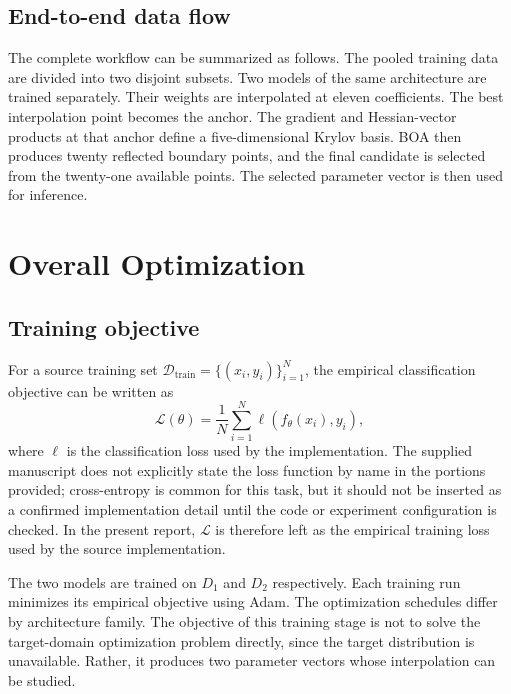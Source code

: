 \documentclass[11pt,a4paper]{article}
\newcommand{\D}{\mathcal{D}}
\begin{document}
\subsection{End-to-end data flow}
The complete workflow can be summarized as follows. The pooled training data are divided into two disjoint subsets. Two models of the same architecture are trained separately. Their weights are interpolated at eleven coefficients. The best interpolation point becomes the anchor. The gradient and Hessian-vector products at that anchor define a five-dimensional Krylov basis. BOA then produces twenty reflected boundary points, and the final candidate is selected from the twenty-one available points. The selected parameter vector is then used for inference.

\section{Overall Optimization}

\subsection{Training objective}
For a source training set $\D_{\mathrm{train}}=\{(x_i,y_i)\}_{i=1}^{N}$, the empirical classification objective can be written as
\begin{equation}
 \mathcal{L}(\theta)=\frac{1}{N}\sum_{i=1}^{N}
 \ell(f_\theta(x_i),y_i),
 \label{eq:empirical_loss}
\end{equation}
where $\ell$ is the classification loss used by the implementation. The supplied manuscript does not explicitly state the loss function by name in the portions provided; cross-entropy is common for this task, but it should not be inserted as a confirmed implementation detail until the code or experiment configuration is checked. In the present report, $\mathcal{L}$ is therefore left as the empirical training loss used by the source implementation.

The two models are trained on $D_1$ and $D_2$ respectively. Each training run minimizes its empirical objective using Adam. The optimization schedules differ by architecture family. The objective of this training stage is not to solve the target-domain optimization problem directly, since the target distribution is unavailable. Rather, it produces two parameter vectors whose interpolation can be studied.
\end{document}
